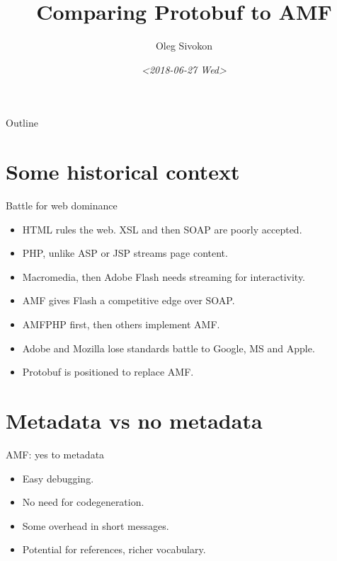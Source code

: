 \documentclass[presentation]{beamer}
\author{Oleg Sivokon}
\date{\textit{<2018-06-27 Wed>}}
\title{Comparing Protobuf to AMF}
\begin{document}
\maketitle
\begin{frame}{Outline}
\tableofcontents
\end{frame}


\section{Some historical context}
\label{sec:org34b3072}

\begin{frame}[label={sec:orgc09b8b9}]{Battle for web dominance}
\begin{itemize}
\item HTML rules the web.  XSL and then SOAP are poorly accepted.
\item PHP, unlike ASP or JSP streams page content.
\item Macromedia, then Adobe Flash needs streaming for interactivity.
\item AMF gives Flash a competitive edge over SOAP.
\item AMFPHP first, then others implement AMF.
\item Adobe and Mozilla lose standards battle to Google, MS and Apple.
\item Protobuf is positioned to replace AMF.
\end{itemize}
\end{frame}

\section{Metadata vs no metadata}
\label{sec:orge38e6ab}

\begin{frame}[label={sec:org28d97ff}]{AMF: yes to metadata}
\begin{itemize}
\item Easy debugging.
\item No need for codegeneration.
\item Some overhead in short messages.
\item Potential for references, richer vocabulary.
\end{itemize}
\end{frame}
\end{document}

